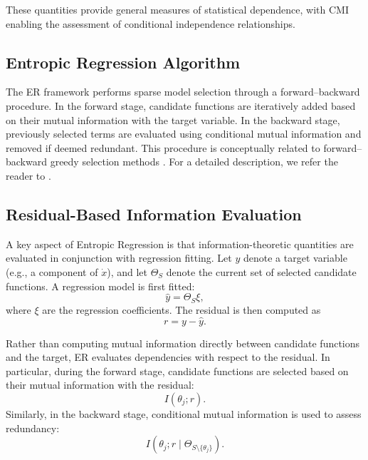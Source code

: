 \documentclass[11pt]{article}
\begin{document}
These quantities provide general measures of statistical dependence, with CMI enabling the assessment of conditional independence relationships.

\subsection{Entropic Regression Algorithm}

The ER framework performs sparse model selection through a forward–backward procedure. In the forward stage, candidate functions are iteratively added based on their mutual information with the target variable. In the backward stage, previously selected terms are evaluated using conditional mutual information and removed if deemed redundant. This procedure is conceptually related to forward–backward greedy selection methods \cite{zhang2008adaptive}. For a detailed description, we refer the reader to \cite{almomani2020entropic}.

\subsection{Residual-Based Information Evaluation}

A key aspect of Entropic Regression is that information-theoretic quantities are evaluated in conjunction with regression fitting. Let $y$ denote a target variable (e.g., a component of $\dot{x}$), and let $\Theta_S$ denote the current set of selected candidate functions. A regression model is first fitted:
\begin{equation}
\hat{y} = \Theta_S \xi,
\end{equation}
where $\xi$ are the regression coefficients. The residual is then computed as
\begin{equation}
r = y - \hat{y}.
\end{equation}

Rather than computing mutual information directly between candidate functions and the target, ER evaluates dependencies with respect to the residual. In particular, during the forward stage, candidate functions are selected based on their mutual information with the residual:
\begin{equation}
I(\theta_j; r).
\end{equation}
Similarly, in the backward stage, conditional mutual information is used to assess redundancy:
\begin{equation}
I(\theta_j; r \mid \Theta_{S \setminus \{\theta_j\}}).
\end{equation}
\end{document}
